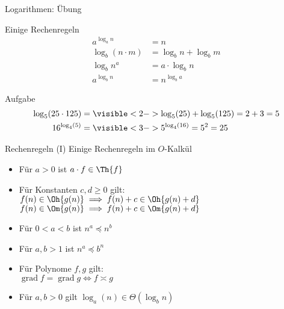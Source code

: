 \begin{frame}{Logarithmen: Übung}
	\begin{block}{Einige Rechenregeln}
		\begin{align*}
			a^{\log_a n} &= n\\
			\log_b (n \cdot m) &= \log_b n + \log_b m\\ 
			\log_b n^a &= a \cdot \log_b n\\
			a^{\log_b n} &= n^{\log_b a}
		\end{align*}
	\end{block}

	\begin{block}{Aufgabe}
		\begin{align*}
			\log_5(25 \cdot 125) &= \visible<2->{\log_5(25) + \log_5(125) = 2+3 = 5}\\
			16^{\log_4(5)} &= \visible<3->{5^{\log_4(16)} = 5^2 = 25}
		\end{align*}
	\end{block}
\end{frame}

\begin{frame}{Rechenregeln (I)}
	Einige Rechenregeln im $O$-Kalkül
	\begin{itemize}[<+->]
		\item Für $a > 0$ ist $a \cdot f \in \Th{f}$ 
		\item Für Konstanten $c, d \geq 0$ gilt: \\ 
			\quad $f(n) \in \Oh{g(n)} \Impl f(n) + c \in \Oh{g(n) + d}$ \\
			\quad $f(n) \in \Om{g(n)} \Impl f(n) + c \in \Om{g(n) + d}$ \\
		\item Für $0 < a < b$ ist $n^a \preceq n^b$
		\item Für $a,b > 1$ ist $n^a \preceq b^n$ 
		\item Für Polynome $f,g$ gilt: \\
			\quad $\mathop{\text{grad}} f = \mathop{\text{grad}} g \iff f \asymp g $
		\item Für $a,b > 0$ gilt $\log_a(n) \in \Theta(\log_b n)$
		
	\end{itemize}
\end{frame}


